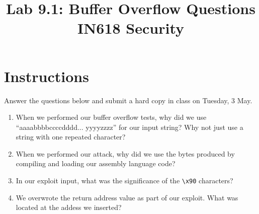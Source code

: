 \documentclass{article}
\begin{document}
\title{ Lab 9.1: Buffer Overflow Questions \\ IN618 Security}
\maketitle

\section*{Instructions}
Answer the questions below and submit a hard copy in class on Tuesday, 3 May.

\begin{enumerate}
	\item When we performed our buffer overflow tests, why did we use ``aaaabbbbccccdddd... yyyyzzzz'' for our input string?  Why not just use a string with one repeated character?
	\vspace{40mm}
	\item When we performed our attack, why did we use the bytes produced by compiling and loading our
	assembly language code?
	\vspace{40mm}
	\item In our exploit input, what was the significance of the \texttt{\textbackslash{}x90} characters?
	\vspace{40mm}
	\item We overwrote the return address value as part of our exploit.  What was located at the addess we inserted?
\end{enumerate}
\end{document}
